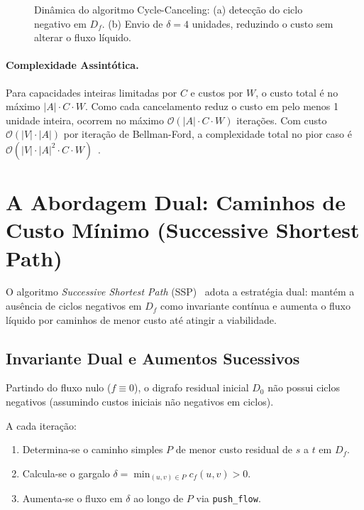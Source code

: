 \begin{figure}[!ht]
\caption{Dinâmica do algoritmo Cycle-Canceling: (a) detecção do ciclo negativo em $D_f$. (b) Envio de $\delta=4$ unidades, reduzindo o custo sem alterar o fluxo líquido.}
\label{fig:cycle_canceling_exec}
\end{figure}

\paragraph{Complexidade Assintótica.}
Para capacidades inteiras limitadas por $C$ e custos por $W$, o custo total é no máximo $|A| \cdot C \cdot W$. Como cada cancelamento reduz o custo em pelo menos 1 unidade inteira, ocorrem no máximo $\mathcal{O}(|A| \cdot C \cdot W)$ iterações. Com custo $\mathcal{O}(|V| \cdot |A|)$ por iteração de Bellman-Ford, a complexidade total no pior caso é $\mathcal{O}(|V| \cdot |A|^2 \cdot C \cdot W)$~\cite{ahuja1993network}.


\section{A Abordagem Dual: Caminhos de Custo Mínimo (Successive Shortest Path)}\label{sec:ssp}

O algoritmo \textit{Successive Shortest Path} (SSP)~\cite{ahuja1993network, schrijver2003combinatorial} adota a estratégia dual: mantém a ausência de ciclos negativos em $D_f$ como invariante contínua e aumenta o fluxo líquido por caminhos de menor custo até atingir a viabilidade.

\subsection{Invariante Dual e Aumentos Sucessivos}

Partindo do fluxo nulo ($f \equiv 0$), o digrafo residual inicial $D_0$ não possui ciclos negativos (assumindo custos iniciais não negativos em ciclos).

A cada iteração:
\begin{enumerate}
    \item Determina-se o caminho simples $P$ de menor custo residual de $s$ a $t$ em $D_f$.
    \item Calcula-se o gargalo $\delta = \min_{(u,v) \in P} c_f(u,v) > 0$.
    \item Aumenta-se o fluxo em $\delta$ ao longo de $P$ via \lstinline{push_flow}.
\end{enumerate}

